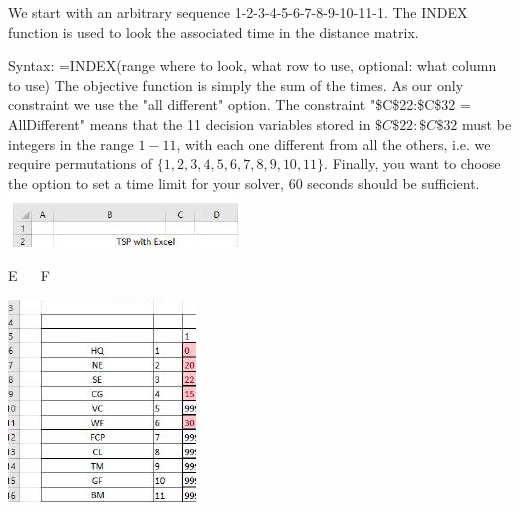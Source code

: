 \documentclass[10pt]{article}
\begin{document}
We start with an arbitrary sequence 1-2-3-4-5-6-7-8-9-10-11-1. The INDEX function is used to look the associated time in the distance matrix.

Syntax: =INDEX(range where to look, what row to use, optional: what column to use) The objective function is simply the sum of the times. As our only constraint we use the "all different" option. The constraint "\$C\$22:\$C\$32 = AllDifferent" means that the 11 decision variables stored in $\$ C \$ 22: \$ C \$ 32$ must be integers in the range $1-11$, with each one different from all the others, i.e. we require permutations of $\{1,2,3,4,5,6,7,8,9,10,11\}$. Finally, you want to choose the option to set a time limit for your solver, 60 seconds should be sufficient.\\

\includegraphics[max width=\textwidth]{2022_07_05_5945264bba2a5f6ba667g-58}

E $\quad$ F

\includegraphics[max width=\textwidth]{2022_07_05_5945264bba2a5f6ba667g-58(1)}\\
\end{document}
